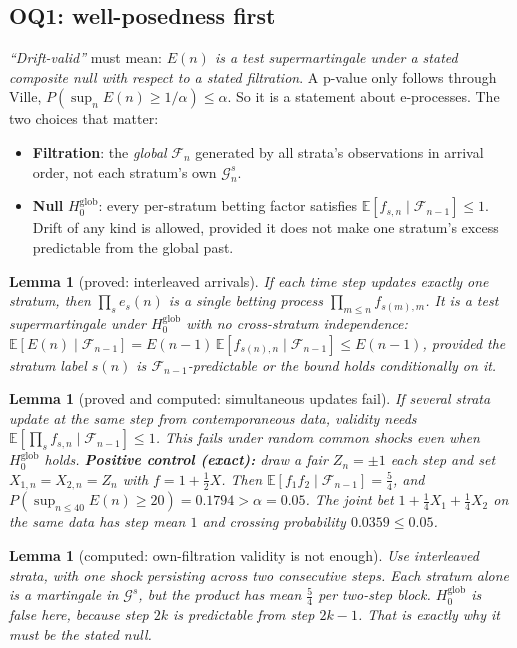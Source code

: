 \documentclass[11pt]{article}
\newtheorem{lemma}[proposition]{Lemma}
\newcommand{\E}{\mathbb{E}}
\newcommand{\Fc}{\mathcal{F}}
\begin{document}
\subsection{OQ1: well-posedness first}
\emph{``Drift-valid''} must mean: \emph{$E(n)$ is a test supermartingale under a stated composite null with respect to a stated filtration}. A p-value only follows through Ville, $P(\sup_n E(n)\ge1/\alpha)\le\alpha$. So it is a statement about e-processes. The two choices that matter:
\begin{itemize}[nosep]
\item \textbf{Filtration}: the \emph{global} $\Fc_n$ generated by all strata's observations in arrival order, not each stratum's own $\mathcal G^s_n$.
\item \textbf{Null} $H_0^{\mathrm{glob}}$: every per-stratum betting factor satisfies $\E[f_{s,n}\mid\Fc_{n-1}]\le1$. Drift of any kind is allowed, provided it does not make one stratum's excess predictable from the global past.
\end{itemize}
\begin{lemma}[proved: interleaved arrivals]
If each time step updates exactly one stratum, then $\prod_s e_s(n)$ is a single betting process $\prod_{m\le n}f_{s(m),m}$. It is a test supermartingale under $H_0^{\mathrm{glob}}$ with \emph{no} cross-stratum independence: $\E[E(n)\mid\Fc_{n-1}]=E(n-1)\,\E[f_{s(n),n}\mid\Fc_{n-1}]\le E(n-1)$, provided the stratum label $s(n)$ is $\Fc_{n-1}$-predictable or the bound holds conditionally on it.
\end{lemma}
\begin{lemma}[proved and computed: simultaneous updates fail]
If several strata update at the same step from contemporaneous data, validity needs $\E[\prod_s f_{s,n}\mid\Fc_{n-1}]\le1$. This fails under random common shocks even when $H_0^{\mathrm{glob}}$ holds. \textbf{Positive control (exact):} draw a fair $Z_n=\pm1$ each step and set $X_{1,n}=X_{2,n}=Z_n$ with $f=1+\tfrac12X$. Then $\E[f_1f_2\mid\Fc_{n-1}]=\tfrac54$, and $P(\sup_{n\le40}E(n)\ge20)=0.1794>\alpha=0.05$. The joint bet $1+\tfrac14X_1+\tfrac14X_2$ on the same data has step mean $1$ and crossing probability $0.0359\le0.05$.
\end{lemma}
\begin{lemma}[computed: own-filtration validity is not enough]
Use interleaved strata, with one shock persisting across two consecutive steps. Each stratum alone is a martingale in $\mathcal G^s$, but the product has mean $\tfrac54$ per two-step block. $H_0^{\mathrm{glob}}$ is false here, because step $2k$ is predictable from step $2k-1$. That is exactly why it must be the stated null.
\end{lemma}
\end{document}
